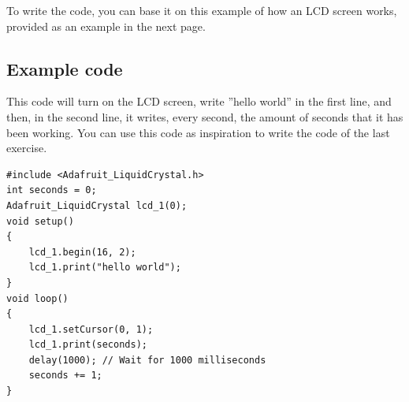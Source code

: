 \documentclass[10pt]{article}
\begin{document}
To write the code, you can base it on this example of how an LCD screen works, provided as an
example in the next page.

\subsection{Example code}
This code will turn on the LCD screen, write ”hello world” in the first line, and then, in the
second line, it writes, every second, the amount of seconds that it has been working. You can
use this code as inspiration to write the code of the last exercise.

\begin{verbatim}
#include <Adafruit_LiquidCrystal.h>
int seconds = 0;
Adafruit_LiquidCrystal lcd_1(0);
void setup()
{
    lcd_1.begin(16, 2);
    lcd_1.print("hello world");
}
void loop()
{
    lcd_1.setCursor(0, 1);
    lcd_1.print(seconds);
    delay(1000); // Wait for 1000 milliseconds
    seconds += 1;
}    
\end{verbatim}
\end{document}
